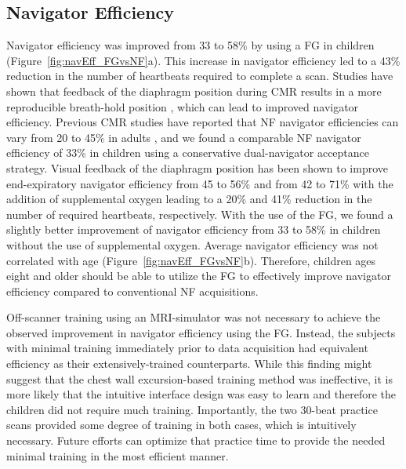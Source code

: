 	\subsection{Navigator Efficiency}
		Navigator efficiency was improved from 33 to 58\% by using a FG in children (Figure~\ref{fig:navEff_FGvsNF}a). This increase in navigator efficiency led to a 43\% reduction in the number of heartbeats required to complete a scan. Studies have shown that feedback of the diaphragm position during CMR results in a more reproducible breath-hold position \cite{Feuerlein2009,Jhooti2011,Kim2012}, which can lead to improved navigator efficiency. Previous CMR studies have reported that NF navigator efficiencies can vary from 20 to 45\% in adults \cite{Abd-Elmoniem2011,Feuerlein2009,Jhooti2011,Wang1996}, and we found a comparable NF navigator efficiency of 33\% in children using a conservative dual-navigator acceptance strategy. Visual feedback of the diaphragm position has been shown to improve end-expiratory navigator efficiency from 45 to 56\% \cite{Jhooti2011} and from 42 to 71\% with the addition of supplemental oxygen \cite{Feuerlein2009} leading to a 20\% and 41\% reduction in the number of required heartbeats, respectively. With the use of the FG, we found a slightly better improvement of navigator efficiency from 33 to 58\% in children without the use of supplemental oxygen. Average navigator efficiency was not correlated with age (Figure~\ref{fig:navEff_FGvsNF}b). Therefore, children ages eight and older should be able to utilize the FG to effectively improve navigator efficiency compared to conventional NF acquisitions.
		
		Off-scanner training using an MRI-simulator was not necessary to achieve the observed improvement in navigator efficiency using the FG. Instead, the subjects with minimal training immediately prior to data acquisition had equivalent efficiency as their extensively-trained counterparts. While this finding might suggest that the chest wall excursion-based training method was ineffective, it is more likely that the intuitive interface design was easy to learn and therefore the children did not require much training. Importantly, the two 30-beat practice scans provided some degree of training in both cases, which is intuitively necessary. Future efforts can optimize that practice time to provide the needed minimal training in the most efficient manner.
	
